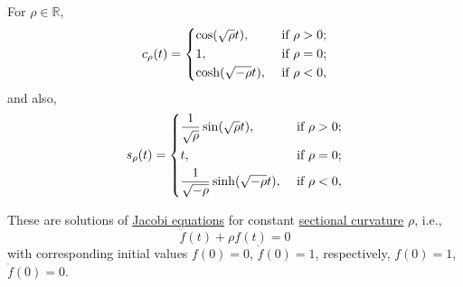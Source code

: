 \begin{notation}
	For \(\rho \in \mathbb{R} \),
	\[
		c_\rho (t) = \begin{dcases}
			\cos (\sqrt{\rho } t),   & \text{ if } \rho > 0 ; \\
			1,                       & \text{ if } \rho = 0 ; \\
			\cosh (\sqrt{-\rho } t), & \text{ if } \rho < 0 ,
		\end{dcases}
	\]
	and also,
	\[
		s_\rho (t) = \begin{dcases}
			\frac{1}{\sqrt{\rho } } \sin (\sqrt{\rho } t),   & \text{ if } \rho > 0 ; \\
			t,                                               & \text{ if } \rho = 0 ; \\
			\frac{1}{\sqrt{-\rho } }\sinh (\sqrt{-\rho } t), & \text{ if } \rho < 0 ,
		\end{dcases}
	\]
\end{notation}

These are solutions of \hyperref[eq:Jacobi]{Jacobi equations} for constant \hyperref[def:sectional-curvature]{sectional curvature} \(\rho \), i.e.,
\[
	\ddot{f}(t) + \rho f(t) = 0
\]
with corresponding initial values \(f(0) = 0\), \(\dot{f} (0) = 1\), respectively, \(f(0) = 1\), \(\dot{f} (0) = 0\).

